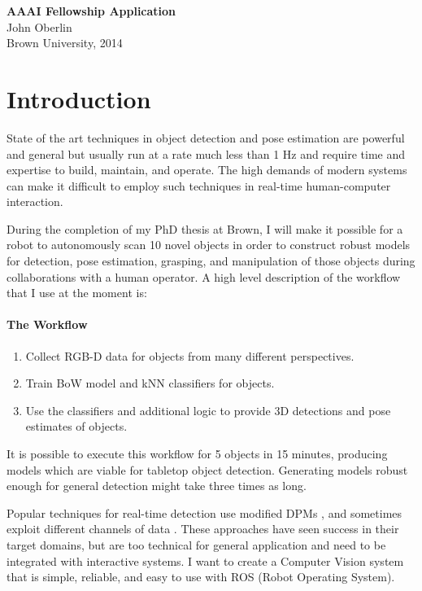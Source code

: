 \documentclass[12pt]{article}
\numberwithin{equation}{section}
\numberwithin{table}{section}
\numberwithin{figure}{section}
\begin{document}



\begin{center}
\textbf{\Large AAAI Fellowship Application}\\[12pt] 
John Oberlin\\
Brown University, 2014\\
\end{center}

\section{Introduction}
State of the art techniques in object detection and pose estimation
are powerful and general but usually run at a rate much less than 1 Hz and require
time and expertise to build, maintain, and operate. The high demands of modern systems
can make it difficult to employ such techniques in real-time human-computer interaction.

During the completion of my PhD thesis at Brown, I will make it possible for a robot
to autonomously scan 10 novel objects in order to construct robust models for detection,
pose estimation, grasping, and manipulation of those objects during collaborations with
a human operator. A high level description of the workflow that I use at the moment is:

\paragraph{The Workflow}
\begin{enumerate}
  \item Collect RGB-D data for objects from many different perspectives.
  \item Train BoW model and kNN classifiers for objects.
  \item Use the classifiers and additional logic to provide 3D detections and pose estimates of objects.
\end{enumerate}

It is possible to execute this workflow for 5 objects in 15 minutes, producing models which are
viable for tabletop object detection. Generating models robust enough for general detection might
take three times as long.

Popular techniques for real-time detection use modified DPMs \cite{kostas1} \cite{forsyth1},
and sometimes exploit different channels of data \cite{dietr1} \cite{sliding1}.  
These approaches have seen success in their target domains, but are too technical for general
application and need to be integrated with interactive systems. I want to create a Computer 
Vision system that is simple, reliable, and easy to use with ROS (Robot Operating System).
\end{document}
